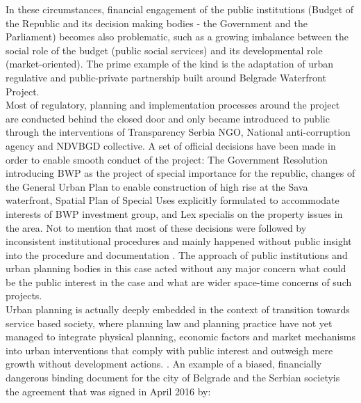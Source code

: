 \documentclass[11pt]{report}
\begin{document}
In these circumstances, financial engagement of the public institutions (Budget of the Republic and its decision making bodies - the Government and the Parliament) becomes also problematic, such as a growing imbalance between the social role of the budget (public social services) and its developmental role (market-oriented).
The prime example of the kind is the adaptation of urban regulative and public-private partnership built around Belgrade Waterfront Project.
\\
Most of regulatory, planning and implementation processes around the project are conducted behind the closed door and only became introduced to public through the interventions of Transparency Serbia NGO, National anti-corruption agency and NDVBGD collective.
A set of official decisions have been made in order to enable smooth conduct of the project: The Government Resolution introducing BWP as the project of special importance for the republic, changes of the General Urban Plan to enable construction of high rise at the Sava waterfront, Spatial Plan of Special Uses explicitly formulated to accommodate interests of BWP investment group, and Lex specialis on the property issues in the area.\footnotemark
Not to mention that most of these decisions were followed by inconsistent institutional procedures and mainly happened without public insight into the procedure and documentation \cite{alternativni izvestaj}.
The approach of public institutions and urban planning bodies in this case acted without any major concern what could be the public interest in the case and what are wider space-time concerns of such projects.
\\
Urban planning is actually deeply embedded in the context of transition towards service based society, where planning law and planning practice have not yet managed to integrate physical planning, economic factors and market mechanisms into urban interventions that comply with public interest and outweigh mere growth without development actions. \cite{Vujosevic 2012}.
An example of a biased, financially dangerous binding document for the city of Belgrade and the Serbian society\footnotemark is the agreement that was signed in April 2016 by:
\end{document}
